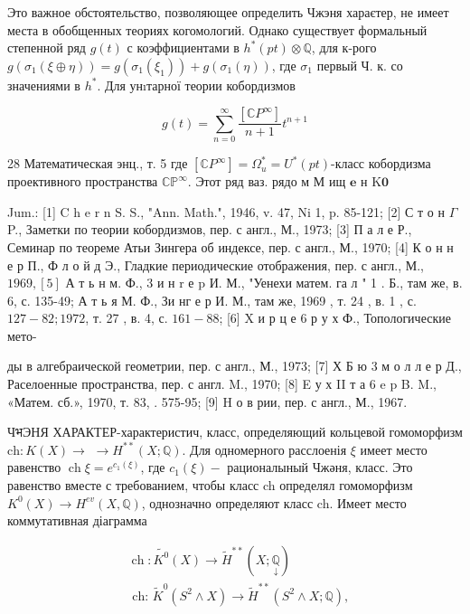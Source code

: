 \documentclass[10pt]{article}
\begin{document}
Это важное обстоятельство, позволяющее определить Чжэня хараєтер, не имеет места в обобщенных теориях когомологий. Однако существует формальный степенной ряд $g(t)$ с коэффициентами в $h^{*}(p t) \otimes \mathbb{Q}$, для к-рого $g\left(\sigma_{1}(\xi \oplus \eta)\right)=g\left(\sigma_{1}\left(\xi_{1}\right)\right)+g\left(\sigma_{1}(\eta)\right)$, где $\sigma_{1}$ первый Ч. к. со значениями в $h^{*}$. Для унıтарної теории кобордизмов



\[

g(t)=\sum_{n=0}^{\infty} \frac{\left[\mathbb{C} P^{\infty}\right]}{n+1} t^{n+1}

\]



28 Математическая энц., т. 5 где $\left[\mathbb{C} P^{\infty}\right]=\Omega_{u}^{*}=U^{*}(p t)$-класс кобордизма проективного пространства $\mathbb{C P}^{\infty}$. Этот ряд ваз. рядо м М ищ $\mathbf{e}$ н $\mathrm{K} \mathbf{0}$



Jum.: [1] C h e r n S. S., "Ann. Math.", 1946, v. 47, Ni 1, p. 85-121; [2] С т о н $\Gamma$ P., Заметки по теории кобордизмов, пер. с англ., М., 1973; [3] П а л е Р., Семинар по теореме Атьи Зингера об индексе, пер. с англ., М., 1970; [4] К о н н е р П., Ф л о й д Э., Гладкие периодические отображения, пер. с англ., М., $1969,[5]$ А т ь н м. Ф., 3 и н r е p И. М., "Уенехи матем. га л " 1 . Б., там же, в. 6, с. 135-49; А т ь я М. Ф., Зи нг е р И. М., там же, 1969 , т. 24 , в. 1 , с. $127-82 ; 1972$, т. 27 , в. 4, с. $161-88$; [6] X и р ц е 6 р у х Ф., Топологические мето-

ды в алгебраической геометрии, пер. с англ., М., 1973; [7] Х Б ю 3 м о л л е р Д., Раселоенные пространства, пер. с англ. M., 1970; [8] E у х II т а 6 e p B. M., «Матем. сб.», 1970, т. 83, . 575-95; [9] H о в рии, пер. с англ., М., 1967.



ЧभЭНЯ ХАРАКТЕР-характеристич, класс, определяющий кольцевой гомоморфизм $\mathrm{ch}: K(X) \longrightarrow$ $\longrightarrow H^{* *}(X ; \mathbb{Q})$. Для одномерного расслоенія $\xi$ имеет место равенство $\operatorname{ch} \xi=e^{c_{1}(\xi)}$, где $c_{1}(\xi)-$ рационалыный Чжәня, класс. Это равенство вместе с требованием, чтобы класс ch определял гомоморфизм $K^{0}(X) \longrightarrow H^{e v}(X, \mathbb{Q})$, однозначно определяют класс ch. Имеет место коммутативная діаграмма



\[

\begin{aligned}

& \operatorname{ch}: \tilde{K^{0}}(X) \rightarrow \tilde{H}^{* *}(X ; \underset{\downarrow}{\mathbb{Q}}) \\

& \text { ch: } \tilde{K}^{0}\left(S^{2} \wedge X\right) \rightarrow \tilde{H}^{* *}\left(S^{2} \wedge X ; \mathbb{Q}\right) \text {, }

\end{aligned}

\]
\end{document}
